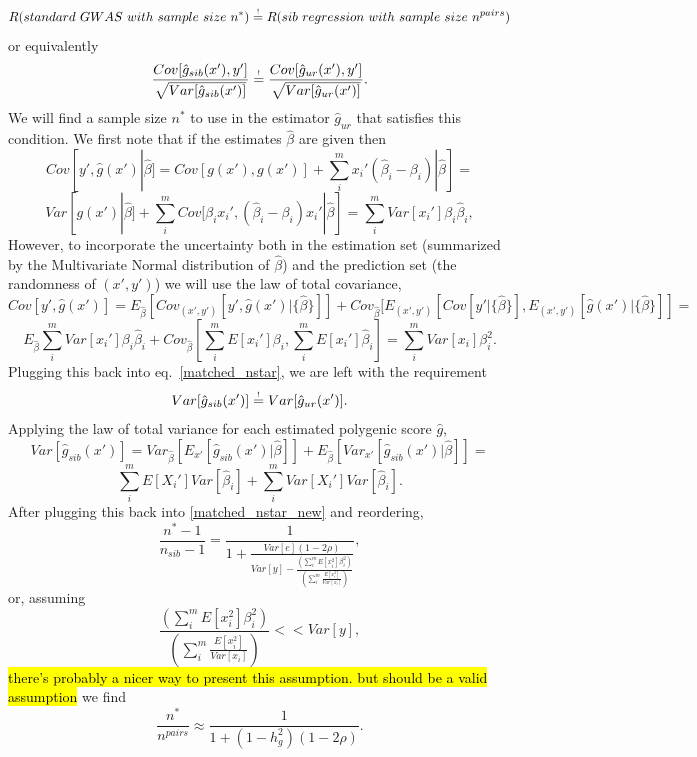 \documentclass[hidelinks, 12pt]{article}
\begin{document}
\newcommand\reqeq{\mathrel{\stackrel{\makebox[0pt]{\mbox{\normalfont\tiny !}}}{=}}}

$$R(standard~GWAS~with~sample~size~n^*) \reqeq R(sib~regression~with~sample~size~n^{pairs})$$
or equivalently
\begin{equation}
\label{matched_nstar}
\frac{Cov[\hat{g}_{sib}(x'),y']}{\sqrt{Var[\hat{g}_{sib}(x')]}} \reqeq \frac{Cov[\hat{g}_{ur}(x'),y']}{\sqrt{Var[\hat{g}_{ur}(x')]}}.
\end{equation}
We will find a sample size $n^*$ to use in the estimator $\hat{g}_{ur}$ that satisfies this condition.  We first note that if the estimates $\hat{\beta}$ are given then
$$ Cov[y',\hat{g}(x')|\hat{\beta}]=Cov[g(x'),g(x')]+\sum_i^m{x_i'(\hat{\beta}_i-\beta_i)}|\hat{\beta}] = $$
$$Var[g(x')|\hat{\beta}]+\sum_i^m{Cov[\beta_ix_i',(\hat{\beta}_i-\beta_i)x_i'}|\hat{\beta}]=\sum_i^mVar[x_i']\beta_i\hat{\beta}_i,$$
However, to incorporate the uncertainty both in the estimation set (summarized by the Multivariate Normal distribution of $\hat{\beta}$) and the prediction set (the randomness of $(x',y')$) we will use the law of total covariance,
$$ Cov[y',\hat{g}(x')]=E_{\hat{\beta}}[Cov_{(x',y')}[y',\hat{g}(x')|\{\hat{\beta}\}]]+Cov_{\hat{\beta}}[E_{(x',y')}[Cov[y'|\{\hat{\beta}\}],E_{(x',y')}[\hat{g}(x')|\{\hat{\beta}\}]]=$$
$$E_{\hat{\beta}}\sum_i^mVar[x_i']\beta_i\hat{\beta}_i+Cov_{\hat{\beta}}[\sum_i^mE[x_i']\beta_i,\sum_i^mE[x_i']\hat{\beta}_i]=\sum_i^mVar[x_i]\beta_i^2.$$
Plugging this back into eq.~\ref{matched_nstar}, we are left with the requirement 
\begin{equation}
\label{matched_nstar_new}
Var[\hat{g}_{sib}(x')] \reqeq Var[\hat{g}_{ur}(x')].
\end{equation}
Applying the law of total variance for each estimated polygenic score $\hat{g}$,
$$Var[\hat{g}_{sib}(x')] =Var_{\hat{\beta}}[E_{x'}[\hat{g}_{sib}(x')|\hat{\beta}]]+E_{\hat{\beta}}[Var_{x'}[\hat{g}_{sib}(x')|\hat{\beta}]] =$$
$$\sum_i^mE[X_i']Var[\hat{\beta}_i]+\sum_i^mVar[X_i']Var[\hat{\beta}_i].$$
After plugging this back into \ref{matched_nstar_new} and reordering, 
$$\frac{n^*-1}{n_{sib}-1}=\frac{1}{1+\frac{Var[e](1-2\rho)}{Var[y]-\frac{(\sum_i^mE[x_i^2]\beta_i^2)}{(\sum_i^m\frac{E[x_i^2]}{Var[x_i]})}}},$$
or, assuming 
$$\frac{(\sum_i^mE[x_i^2]\beta_i^2)}{(\sum_i^m\frac{E[x_i^2]}{Var[x_i]})} << Var[y],$$ 
\hl{there's probably a nicer way to present this assumption. but should be a valid assumption}
we find
\begin{equation}
\label{final_nstar_just_direct}
\frac{n^*}{n^{pairs}} \approx \frac{1}{1+(1-h_g^2)(1-2\rho)}.
\end{equation}
\end{document}
